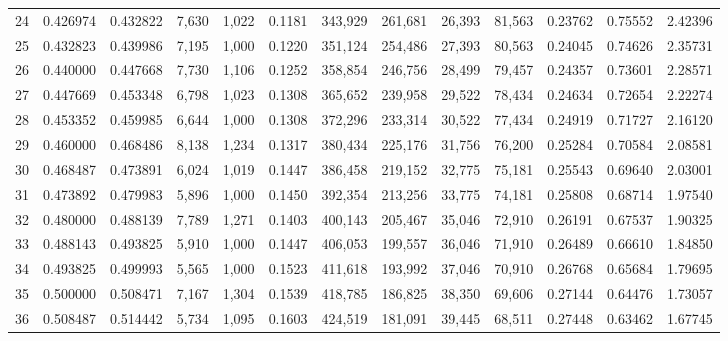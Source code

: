 \begin{tabular}{rrrrrrrrrrrrr}
24 &  0.426974 &  0.432822 &   7,630 &  1,022 &                                     0.1181 &  343,929 &  261,681 &   26,393 &   81,563 &  0.23762 &  0.75552 &  2.42396 \\
25 &  0.432823 &  0.439986 &   7,195 &  1,000 &                                     0.1220 &  351,124 &  254,486 &   27,393 &   80,563 &  0.24045 &  0.74626 &  2.35731 \\
26 &  0.440000 &  0.447668 &   7,730 &  1,106 &                                     0.1252 &  358,854 &  246,756 &   28,499 &   79,457 &  0.24357 &  0.73601 &  2.28571 \\
27 &  0.447669 &  0.453348 &   6,798 &  1,023 &                                     0.1308 &  365,652 &  239,958 &   29,522 &   78,434 &  0.24634 &  0.72654 &  2.22274 \\
28 &  0.453352 &  0.459985 &   6,644 &  1,000 &                                     0.1308 &  372,296 &  233,314 &   30,522 &   77,434 &  0.24919 &  0.71727 &  2.16120 \\
29 &  0.460000 &  0.468486 &   8,138 &  1,234 &                                     0.1317 &  380,434 &  225,176 &   31,756 &   76,200 &  0.25284 &  0.70584 &  2.08581 \\
30 &  0.468487 &  0.473891 &   6,024 &  1,019 &                                     0.1447 &  386,458 &  219,152 &   32,775 &   75,181 &  0.25543 &  0.69640 &  2.03001 \\
31 &  0.473892 &  0.479983 &   5,896 &  1,000 &                                     0.1450 &  392,354 &  213,256 &   33,775 &   74,181 &  0.25808 &  0.68714 &  1.97540 \\
32 &  0.480000 &  0.488139 &   7,789 &  1,271 &                                     0.1403 &  400,143 &  205,467 &   35,046 &   72,910 &  0.26191 &  0.67537 &  1.90325 \\
33 &  0.488143 &  0.493825 &   5,910 &  1,000 &                                     0.1447 &  406,053 &  199,557 &   36,046 &   71,910 &  0.26489 &  0.66610 &  1.84850 \\
34 &  0.493825 &  0.499993 &   5,565 &  1,000 &                                     0.1523 &  411,618 &  193,992 &   37,046 &   70,910 &  0.26768 &  0.65684 &  1.79695 \\
35 &  0.500000 &  0.508471 &   7,167 &  1,304 &                                     0.1539 &  418,785 &  186,825 &   38,350 &   69,606 &  0.27144 &  0.64476 &  1.73057 \\
36 &  0.508487 &  0.514442 &   5,734 &  1,095 &                                     0.1603 &  424,519 &  181,091 &   39,445 &   68,511 &  0.27448 &  0.63462 &  1.67745 \\

\end{tabular}
